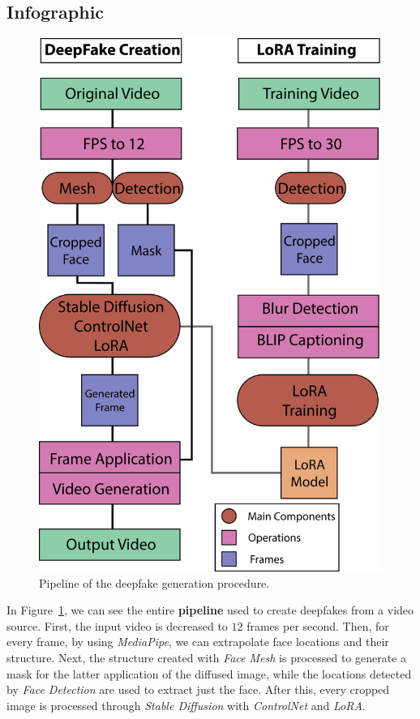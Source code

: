 \documentclass[preprint]{elsarticle}
\begin{document}
\subsection{Infographic}\label{sec:project_info}

\begin{figure}[t]
	\centering
	\includegraphics[scale=0.65]{img/svg/Info.png}
	\caption{Pipeline of the deepfake generation procedure.}\label{fig:project}
\end{figure}




In Figure~\ref{fig:project}, we can see the entire \textbf{pipeline} used to create deepfakes from a video source. 
First, the input video is decreased to $12$ frames per second. Then, for every frame, by using \emph{MediaPipe}, we can extrapolate face locations and their structure.  Next, the structure created with \emph{Face Mesh} is processed to generate a mask for the latter application of the diffused image, 
while the locations detected by \emph{Face Detection} are used to extract just the face. After this, every cropped image is processed through \emph{Stable Diffusion} with \emph{ControlNet} and \emph{LoRA}. 
\end{document}
